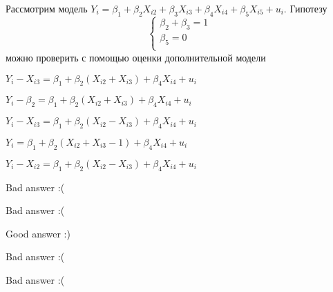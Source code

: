 
\begin{question}
Рассмотрим модель \(Y_i = {\beta_1} + {\beta_2}{X_{i2}} + {\beta_3}{X_{i3}} + {\beta_4}{X_{i4}} + {\beta_5}{X_{i5}} + u_i\).
Гипотезу
\[
\begin{cases}
{\beta_2} + {\beta _3} = 1\\
{\beta_5} = 0 \\
\end{cases}
\]
можно проверить с помощью оценки дополнительной модели
\begin{answerlist}
  \item \(Y_i - X_{i3} = \beta_1 + \beta_2 (X_{i2} + X_{i3}) + \beta_4 X_{i4} + u_i\)
  \item \(Y_i - \beta_2 = \beta_1 + \beta_2 (X_{i2} + X_{i3}) + \beta_4 X_{i4} + u_i\)
  \item \(Y_i - X_{i3} = \beta_1 + \beta_2 (X_{i2} - X_{i3}) + \beta_4 X_{i4} + u_i\)
  \item \(Y_i = \beta_1 + \beta_2 (X_{i2} + X_{i3} - 1) + \beta_4 X_{i4} + u_i\)
  \item \(Y_i - X_{i2} = \beta_1 + \beta_2 (X_{i2} - X_{i3}) + \beta_4 X_{i4} + u_i\)
\end{answerlist}
\end{question}

\begin{solution}
\begin{answerlist}
  \item Bad answer :(
  \item Bad answer :(
  \item Good answer :)
  \item Bad answer :(
  \item Bad answer :(
\end{answerlist}
\end{solution}

